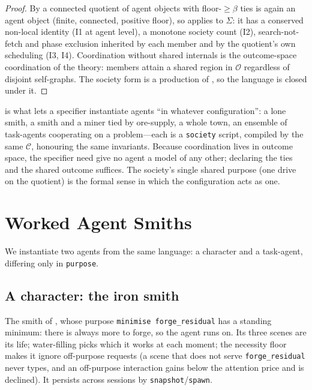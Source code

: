 \documentclass[11pt,twocolumn,a4paper]{article}
\newcommand{\floorc}{\beta}
\newcommand{\Soc}{\Sigma}
\newcommand{\Out}{\mathcal{O}}
\newcommand{\compile}{\mathcal{C}}     %
\begin{document}
\begin{proof}
By  a connected quotient of agent objects with
floor-$\ge\floorc$ ties is again an agent object (finite, connected, positive
floor), so  applies to $\Soc$: it has a conserved non-local
identity (I1 at agent level), a monotone society count (I2), search-not-fetch
and phase exclusion inherited by each member and by the quotient's own
scheduling (I3, I4). Coordination without shared internals is the
outcome-space coordination of the theory: members attain a shared region in
$\Out$ regardless of disjoint self-graphs. The society form is a production of
, so the language is closed under it.
\end{proof}

\begin{remark}
\label{rem:configuration}
 is what lets a specifier instantiate agents ``in whatever
configuration'': a lone smith, a smith and a miner tied by ore-supply, a whole
town, an ensemble of task-agents cooperating on a problem---each is a
\texttt{society} script, compiled by the same $\compile$, honouring the same
invariants. Because coordination lives in outcome space, the specifier need
give no agent a model of any other; declaring the ties and the shared outcome
suffices. The society's single shared purpose (one drive on the quotient) is
the formal sense in which the configuration acts as one.
\end{remark}

\section{Worked Agent Smiths}
\label{sec:examples}

We instantiate two agents from the same language: a character and a task-agent,
differing only in \texttt{purpose}.

\subsection{A character: the iron smith}

The smith of , whose purpose \texttt{minimise
forge\_residual} has a standing minimum: there is always more to forge, so the
agent runs on. Its three scenes are its life; water-filling picks which it
works at each moment; the necessity floor makes it ignore off-purpose requests
(a scene that does not serve \texttt{forge\_residual} never types, and an
off-purpose interaction gains below the attention price and is declined). It
persists across sessions by \texttt{snapshot}/\texttt{spawn}.
\end{document}
